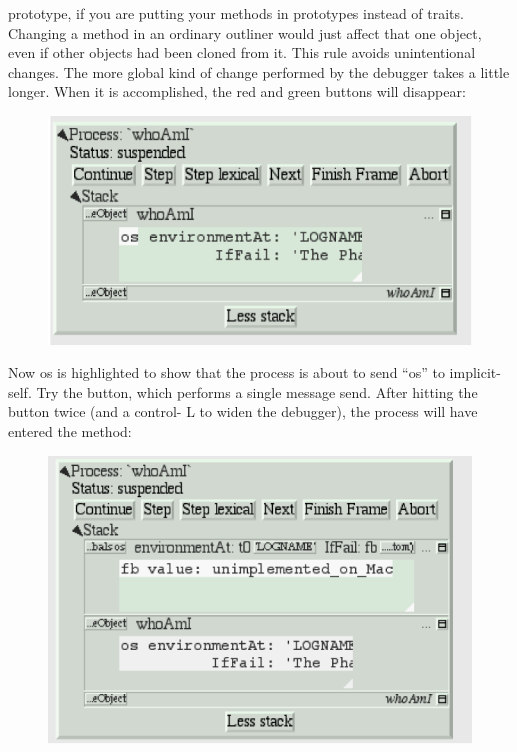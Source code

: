 \documentclass[letterpaper,10pt,english]{sphinxmanual}
\begin{document}
prototype, if you are putting your methods in prototypes instead of traits. Changing a method in an
ordinary outliner would just affect that one object, even if other objects had been cloned from it.
This rule avoids unintentional changes. The more global kind of change performed by the debugger
takes a little longer. When it is accomplished, the red and green buttons will disappear:
\begin{figure}[htbp]\begin{flushleft}

\includegraphics{Pgm_Env_Image29.png}
\end{flushleft}\end{figure}

Now os is highlighted to show that the process is about to send “os” to implicit-self. Try the 
button, which performs a single message send. After hitting the  button twice (and a control-
L to widen the debugger), the process will have entered the  method:
\begin{figure}[htbp]\begin{flushleft}

\includegraphics{Pgm_Env_Image30.png}
\end{flushleft}\end{figure}
\end{document}
